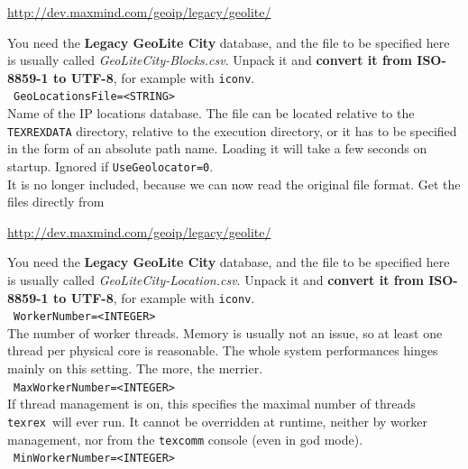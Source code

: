 \documentclass[12pt,a4paper]{article}
\newcommand{\trthis}{\texttt{texrex}}
\begin{document}
\begin{center}
  \url{http://dev.maxmind.com/geoip/legacy/geolite/}
\end{center}

You need the \textbf{Legacy GeoLite City} database, and the file to be specified here is usually called \textit{GeoLiteCity-Blocks.csv}.
Unpack it and \textbf{convert it from ISO-8859-1 to UTF-8}, for example with \texttt{iconv}.\\

\noindent\textbullet~\texttt{GeoLocationsFile=<STRING>}\\

Name of the IP locations database.
The file can be located relative to the \texttt{TEXREXDATA} directory, relative to the execution directory, or it has to be specified in the form of an absolute path name.
Loading it will take a few seconds on startup.
Ignored if \texttt{UseGeolocator=0}.\\
It is no longer included, because we can now read the original file format.
Get the files directly from

\begin{center}
  \url{http://dev.maxmind.com/geoip/legacy/geolite/}
\end{center}

You need the \textbf{Legacy GeoLite City} database, and the file to be specified here is usually called \textit{GeoLiteCity-Location.csv}.
Unpack it and \textbf{convert it from ISO-8859-1 to UTF-8}, for example with \texttt{iconv}.\\

\noindent\textbullet~\texttt{WorkerNumber=<INTEGER>}\\

The number of worker threads.
Memory is usually not an issue, so at least one thread per physical core is reasonable.
The whole system performances hinges mainly on this setting.
The more, the merrier.\\

\noindent\textbullet~\texttt{MaxWorkerNumber=<INTEGER>}\\

If thread management is on, this specifies the maximal number of threads \trthis\ will ever run.
It cannot be overridden at runtime, neither by worker management, nor from the \texttt{texcomm} console (even in god mode).\\

\noindent\textbullet~\texttt{MinWorkerNumber=<INTEGER>}\\
\end{document}
